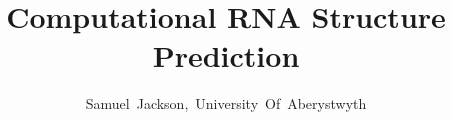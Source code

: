 \documentclass[journal]{IEEEtran}
\begin{document}
%
\title{Computational RNA Structure Prediction}
%
%
%

\author{Samuel~Jackson,~University~Of~Aberystwyth}

% 
%



% 
\end{document}
